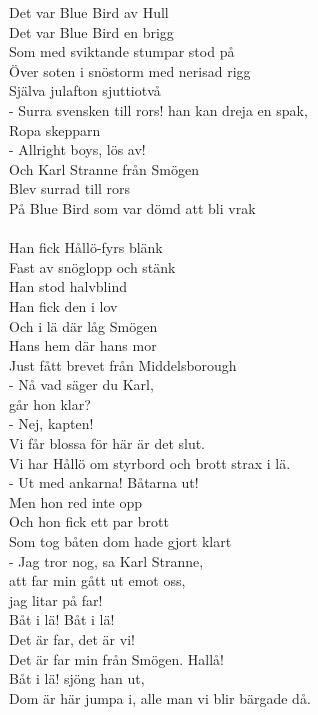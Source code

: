 \vspace{10pt}
Det var Blue Bird av Hull\\
Det var Blue Bird en brigg\\
Som med sviktande stumpar stod på\\
Över soten i snöstorm med nerisad rigg\\
Själva julafton sjuttiotvå\\
- Surra svensken till rors! han kan dreja en spak,\\
Ropa skepparn\\
- Allright boys, lös av!\\
Och Karl Stranne från Smögen\\
Blev surrad till rors\\
På Blue Bird som var dömd att bli vrak\\
\\
Han fick Hållö-fyrs blänk\\
Fast av snöglopp och stänk\\
Han stod halvblind\\
Han fick den i lov\\
Och i lä där låg Smögen\\
Hans hem där hans mor\\
Just fått brevet från Middelsborough\\
- Nå vad säger du Karl,\\
går hon klar?\\
- Nej, kapten!\\
Vi får blossa för här är det slut.\\
Vi har Hållö om styrbord och brott strax i lä.\\
- Ut med ankarna! Båtarna ut!\\
Men hon red inte opp\\
Och hon fick ett par brott\\
Som tog båten dom hade gjort klart\\
- Jag tror nog, sa Karl Stranne,\\
att far min gått ut emot oss,\\
jag litar på far!\\
Båt i lä! Båt i lä!\\
Det är far, det är vi!\\
Det är far min från Smögen. Hallå!\\
Båt i lä! sjöng han ut,\\
Dom är här jumpa i, alle man vi blir bärgade då.\\
